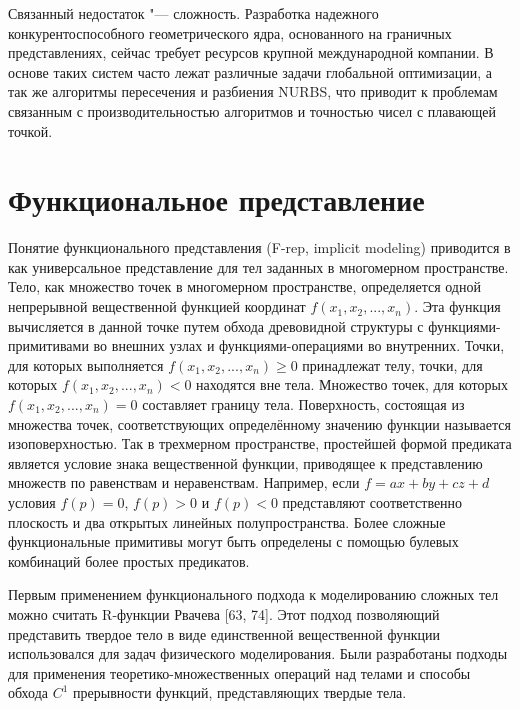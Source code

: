{{{{{Связанный недостаток "--- сложность. Разработка надежного  конкурентоспособного геометрического ядра, основанного на граничных представлениях, сейчас требует ресурсов крупной международной компании. В основе таких систем часто лежат различные задачи глобальной оптимизации, а так же алгоритмы пересечения и разбиения NURBS, что приводит к проблемам связанным с производительностью алгоритмов и точностью чисел с плавающей точкой.

\section{Функциональное представление} \label{sect_implicit}

Понятие функционального представления (F-rep, implicit modeling) приводится в  как универсальное представление для тел заданных в многомерном пространстве. Тело, как множество точек в многомерном пространстве, определяется одной непрерывной вещественной функцией координат $f(x_{1},x_{2},...,x_{n})$. Эта функция вычисляется в данной точке путем обхода древовидной структуры с функциями-примитивами во внешних узлах и функциями-операциями во внутренних. Точки, для которых выполняется $f(x_{1},x_{2},...,x_{n})\geq 0$ принадлежат телу, точки, для которых $ f(x_{1},x_{2},...,x_{n})<0$ находятся вне тела. Множество точек, для которых $f(x_{1},x_{2},...,x_{n})=0$ составляет границу тела. Поверхность, состоящая из множества точек, соответствующих определённому значению функции называется изоповерхностью. Так в трехмерном пространстве, простейшей формой предиката является условие знака вещественной функции, приводящее к представлению множеств по равенствам и неравенствам. Например, если $ f = ax + by + cz + d$  условия $f (p) = 0$, $f (p)> 0$ и $f (p) <0$ представляют соответственно плоскость и два открытых линейных полупространства. Более сложные функциональные примитивы могут быть определены с помощью булевых комбинаций более простых предикатов.

Первым применением функционального подхода к моделированию сложных тел можно считать R-функции Рвачева [63, 74]. Этот подход позволяющий представить твердое тело в виде единственной вещественной функции использовался для задач физического моделирования. Были разработаны подходы для применения теоретико-множественных операций над телами и способы обхода $C^1$ прерывности функций, представляющих твердые тела. 

}}}}}
